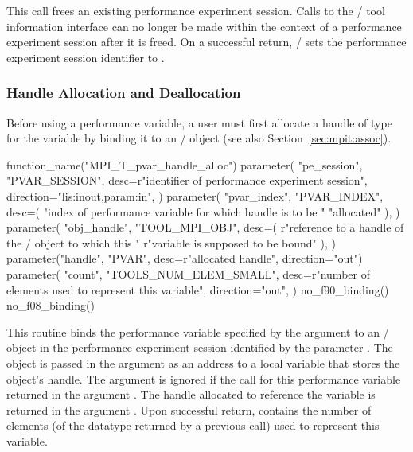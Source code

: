 This call frees an existing performance experiment session.  Calls to the \MPI/ tool information
interface  can no longer be made within the context of a performance experiment session after it
is freed.  On a successful return, \MPI/ sets the performance experiment session identifier to
.


\subsubsection{Handle Allocation and Deallocation}

Before using a performance variable, a user must first allocate a handle of
type  for
the variable by binding it to an \MPI/ object (see also
Section~\ref{sec:mpit:assoc}).

\begin{mpi-binding}
    function_name("MPI_T_pvar_handle_alloc")
    parameter(
        "pe_session",
        "PVAR_SESSION",
        desc=r"identifier of performance experiment session",
        direction="lis:inout,param:in",
    )
    parameter(
        "pvar_index",
        "PVAR_INDEX",
        desc=(
            "index of performance variable for which handle is to be "
            "allocated"
        ),
    )
    parameter(
        "obj_handle",
        "TOOL_MPI_OBJ",
        desc=(
            r"reference to a handle of the \mpi/ object to which this "
            r"variable is supposed to be bound"
        ),
    )
    parameter("handle", "PVAR", desc=r"allocated handle", direction="out")
    parameter(
        "count",
        "TOOLS_NUM_ELEM_SMALL",
        desc=r"number of elements used to represent this variable",
        direction="out",
    )
    no_f90_binding()
    no_f08_binding()
\end{mpi-binding}

This routine binds the performance variable specified by the argument
 to an \MPI/ object  in the performance experiment session identified by the
parameter .  The object is passed in the argument
 as an address to a local variable that stores the
object's handle.  The argument  is ignored if the
 call for this performance variable
returned  in the argument .
The handle allocated to reference the variable is returned in the argument
.  Upon successful return,  contains the
number of elements (of the datatype returned by a previous
 call) used to represent this variable.

